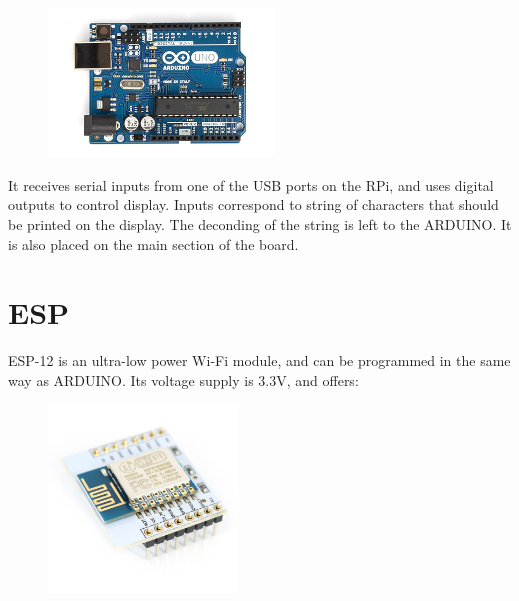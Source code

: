 \documentclass[a4paper,twoside]{book}
\begin{document}
\begin{appendices}
\begin{figure}
    \centering
    \includegraphics[width=6cm]{img/ArduinoUno}
\end{figure}

It receives serial inputs from one of the USB ports on the RPi, and uses digital outputs to control display. Inputs correspond to string of characters that should be printed on the display. The deconding of the string is left to the ARDUINO. 
It is also placed on the main section of the board.

\section{ESP}
\label{app:ESP}
ESP-12  is an ultra-low power Wi-Fi module, and can be programmed in the same way as ARDUINO. Its voltage supply is 3.3V, and offers:

\begin{figure}[h]
    \centering
    \includegraphics[width=5cm]{img/ESP12}
\end{figure}


\end{appendices}
\end{document}
